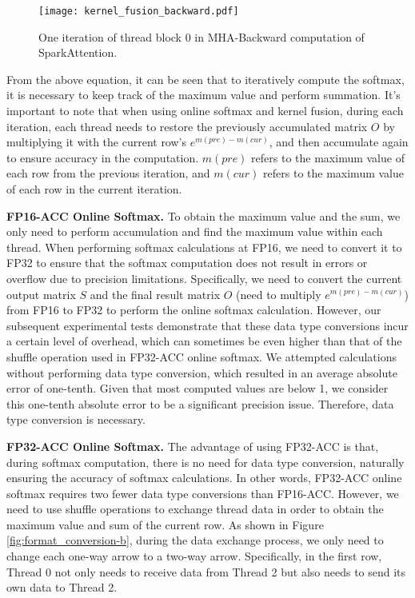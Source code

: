 \documentclass[10pt,twocolumn]{article}
\begin{document}
\begin{figure*}[htbp] \small
  \centering
  \texttt{[image: kernel\_fusion\_backward.pdf]}
  \caption{One iteration of thread block 0 in MHA-Backward computation of SparkAttention.}
  \label{fig:kernel_fusion_backward}%
\end{figure*}

From the above equation, it can be seen that to iteratively compute the softmax, it is necessary to keep track of the maximum value and perform summation. 
It's important to note that when using online softmax and kernel fusion, during each iteration, each thread needs to restore the previously accumulated matrix $O$ by multiplying it with the current row's $e^{m(pre) - m(cur)}$, and then accumulate again to ensure accuracy in the computation. 
$m(pre)$ refers to the maximum value of each row from the previous iteration, and $m(cur)$ refers to the maximum value of each row in the current iteration.

\textbf{FP16-ACC Online Softmax.}
To obtain the maximum value and the sum, we only need to perform accumulation and find the maximum value within each thread.
When performing softmax calculations at FP16, we need to convert it to FP32 to ensure that the softmax computation does not result in errors or overflow due to precision limitations.
Specifically, we need to convert the current output matrix $S$ and the final result matrix $O$ (need to multiply $e^{m(pre) - m(cur)}$) from FP16 to FP32 to perform the online softmax calculation.
However, our subsequent experimental tests demonstrate that these data type conversions incur a certain level of overhead, which can sometimes be even higher than that of the shuffle operation used in FP32-ACC online softmax.
We attempted calculations without performing data type conversion, which resulted in an average absolute error of one-tenth.
Given that most computed values are below 1, we consider this one-tenth absolute error to be a significant precision issue. 
Therefore, data type conversion is necessary. 

\textbf{FP32-ACC Online Softmax.}
The advantage of using FP32-ACC is that, during softmax computation, there is no need for data type conversion, naturally ensuring the accuracy of softmax calculations.
In other words, FP32-ACC online softmax requires two fewer data type conversions than FP16-ACC.
However, we need to use shuffle operations to exchange thread data in order to obtain the maximum value and sum of the current row.
As shown in Figure \ref{fig:format_conversion-b}, during the data exchange process, we only need to change each one-way arrow to a two-way arrow.
Specifically, in the first row, Thread 0 not only needs to receive data from Thread 2 but also needs to send its own data to Thread 2.
\end{document}
